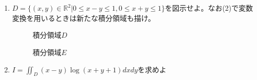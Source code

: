 \documentclass[a4paper,10pt]{jarticle}
\begin{document}
\newpage
\section{}
\begin{enumerate}
\item $D=\{(x,y) \in \mathbb{R}^2 | 0 \leq x-y \leq 1, 0 \leq x+y \leq 1\}$を図示せよ。なお(2)で変数変換を用いるときは新たな積分領域も描け。

\begin{figure}[h]\begin{minipage}{0.5\hsize}
	\begin{center}
	\end{center}
 	\caption{積分領域$D$}
\end{minipage}
\begin{minipage}{0.5\hsize}
	\begin{center}
	\end{center}
	\caption{積分領域$E$}
\end{minipage}
\end{figure}

\item$ I = \iint_{D} (x-y)\log{(x+y+1)}dxdy $を求めよ


\end{enumerate}
\end{document}
